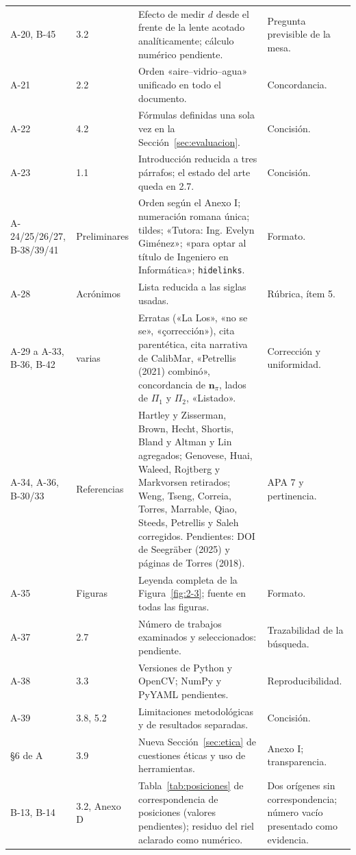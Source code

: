 \documentclass{report}
\begin{document}
\begin{longtable}{@{}p{1.6cm}p{2.0cm}p{6.0cm}p{5.0cm}@{}}
A-20, B-45 & 3.2 & Efecto de medir $d$ desde el frente de la lente acotado analíticamente; cálculo numérico pendiente. & Pregunta previsible de la mesa. \\
A-21 & 2.2 & Orden «aire--vidrio--agua» unificado en todo el documento. & Concordancia. \\
A-22 & 4.2 & Fórmulas definidas una sola vez en la Sección~\ref{sec:evaluacion}. & Concisión. \\
A-23 & 1.1 & Introducción reducida a tres párrafos; el estado del arte queda en 2.7. & Concisión. \\
A-24/25/26/27, B-38/39/41 & Preliminares & Orden según el Anexo I; numeración romana única; tildes; «Tutora: Ing. Evelyn Giménez»; «para optar al título de Ingeniero en Informática»; \texttt{hidelinks}. & Formato. \\
A-28 & Acrónimos & Lista reducida a las siglas usadas. & Rúbrica, ítem 5. \\
A-29 a A-33, B-36, B-42 & varias & Erratas («La Los», «no se se», «çorrección»), cita parentética, cita narrativa de CalibMar, «Petrellis (2021) combinó», concordancia de $\mathbf{n}_\pi$, lados de $\Pi_1$ y $\Pi_2$, «Listado». & Corrección y uniformidad. \\
A-34, A-36, B-30/33 & Referencias & Hartley y Zisserman, Brown, Hecht, Shortis, Bland y Altman y Lin agregados; Genovese, Huai, Waleed, Rojtberg y Markvorsen retirados; Weng, Tseng, Correia, Torres, Marrable, Qiao, Steeds, Petrellis y Saleh corregidos. Pendientes: DOI de Seegräber (2025) y páginas de Torres (2018). & APA 7 y pertinencia. \\
A-35 & Figuras & Leyenda completa de la Figura~\ref{fig:2-3}; fuente en todas las figuras. & Formato. \\
A-37 & 2.7 & Número de trabajos examinados y seleccionados: pendiente. & Trazabilidad de la búsqueda. \\
A-38 & 3.3 & Versiones de Python y OpenCV; NumPy y PyYAML pendientes. & Reproducibilidad. \\
A-39 & 3.8, 5.2 & Limitaciones metodológicas y de resultados separadas. & Concisión. \\
§6 de A & 3.9 & Nueva Sección~\ref{sec:etica} de cuestiones éticas y uso de herramientas. & Anexo I; transparencia. \\
B-13, B-14 & 3.2, Anexo D & Tabla~\ref{tab:posiciones} de correspondencia de posiciones (valores pendientes); residuo del riel aclarado como numérico. & Dos orígenes sin correspondencia; número vacío presentado como evidencia. \\

\end{longtable}
\end{document}
